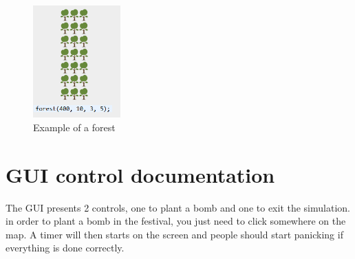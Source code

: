\newpage

\begin{figure}[h]
	\begin{center}
		\includegraphics[width=0.3\textwidth]{img/forest.png}
	\end{center}
	\caption{Example of a forest}
\end{figure}

\section{GUI control documentation}
 
The GUI presents 2 controls, one to plant a bomb and one to exit the simulation. in order to plant a bomb in the festival, you just need to click somewhere on the map. A timer will then starts on the screen and people should start panicking if everything is done correctly.
